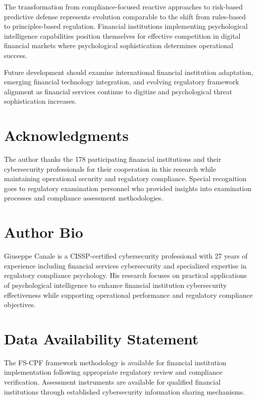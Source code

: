 \documentclass[10pt, twocolumn]{article}
\begin{document}
The transformation from compliance-focused reactive approaches to risk-based predictive defense represents evolution comparable to the shift from rules-based to principles-based regulation. Financial institutions implementing psychological intelligence capabilities position themselves for effective competition in digital financial markets where psychological sophistication determines operational success.

Future development should examine international financial institution adaptation, emerging financial technology integration, and evolving regulatory framework alignment as financial services continue to digitize and psychological threat sophistication increases.

\section*{Acknowledgments}

The author thanks the 178 participating financial institutions and their cybersecurity professionals for their cooperation in this research while maintaining operational security and regulatory compliance. Special recognition goes to regulatory examination personnel who provided insights into examination processes and compliance assessment methodologies.

\section*{Author Bio}

Giuseppe Canale is a CISSP-certified cybersecurity professional with 27 years of experience including financial services cybersecurity and specialized expertise in regulatory compliance psychology. His research focuses on practical applications of psychological intelligence to enhance financial institution cybersecurity effectiveness while supporting operational performance and regulatory compliance objectives.

\section*{Data Availability Statement}

The FS-CPF framework methodology is available for financial institution implementation following appropriate regulatory review and compliance verification. Assessment instruments are available for qualified financial institutions through established cybersecurity information sharing mechanisms.
\end{document}
